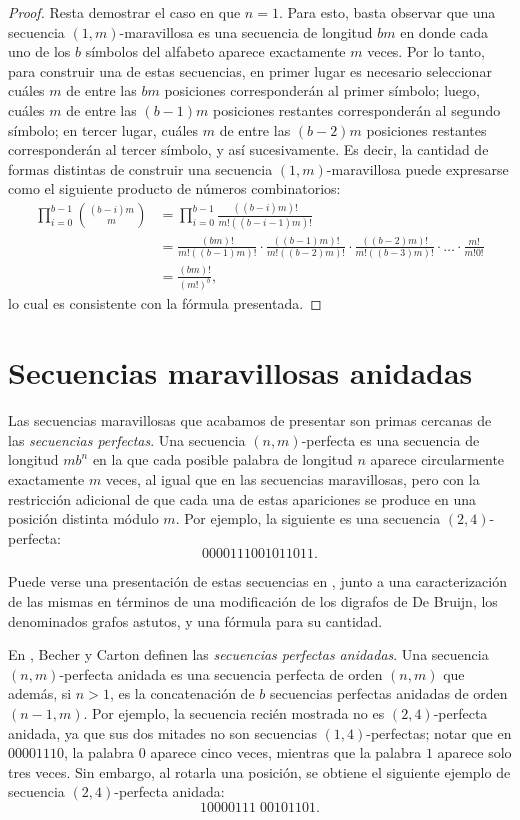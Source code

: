 \begin{proof}
	Resta demostrar el caso en que $n = 1$. Para esto, basta observar que una
	secuencia $(1,m)$-maravillosa es una secuencia de longitud $bm$ en donde
	cada uno de los $b$ símbolos del alfabeto aparece exactamente $m$ veces.
	Por lo tanto, para construir una de estas secuencias, en primer lugar es
	necesario seleccionar cuáles $m$ de entre las $bm$ posiciones corresponderán
	al primer símbolo; luego, cuáles $m$ de entre las $(b - 1)m$ posiciones
	restantes corresponderán al segundo símbolo; en tercer lugar, cuáles $m$ de
	entre las $(b - 2)m$ posiciones restantes corresponderán al tercer símbolo,
	y así sucesivamente. Es decir, la cantidad de formas distintas de construir
	una secuencia $(1,m)$-maravillosa puede expresarse como el siguiente producto
	de números combinatorios:
	\begin{align*}
		\prod_{i = 0}^{b - 1} \binom{(b - i)m}{m}
			&= \prod_{i = 0}^{b - 1} \frac{((b-i)m)!}{m!((b-i-1)m)!} \\
			&= \frac{(bm)!}{m!((b-1)m)!} \cdot
				\frac{((b-1)m)!}{m!((b-2)m)!} \cdot
				\frac{((b-2)m)!}{m!((b-3)m)!} \cdot \dots \cdot
				\frac{m!}{m!0!} \\
			&= \frac{(bm)!}{(m!)^b},
		\end{align*}
	lo cual es consistente con la fórmula presentada.
\end{proof}

\section{Secuencias maravillosas anidadas}

Las secuencias maravillosas que acabamos de presentar son primas cercanas de
las \emph{secuencias perfectas}.
Una secuencia $(n,m)$-perfecta es una secuencia de longitud $m b^n$ en la
que cada posible palabra de longitud $n$ aparece circularmente exactamente
$m$ veces, al igual que en las secuencias maravillosas, pero con la restricción
adicional de que cada una de estas apariciones se produce en una posición
distinta módulo $m$. Por ejemplo, la siguiente es una secuencia $(2,4)$-perfecta:
\[ 0000111001011011. \]

Puede verse una presentación de estas secuencias en \cite{alvarez-perfect-necklaces},
junto a una caracterización de las mismas en términos de una modificación
de los digrafos de De Bruijn, los denominados grafos astutos, y una fórmula
para su cantidad.

En \cite{becher-nested-perfect}, Becher y Carton definen las \emph{secuencias
perfectas anidadas}. Una secuencia $(n,m)$-perfecta anidada es una secuencia
perfecta de orden $(n,m)$ que además, si $n > 1$, es la concatenación de $b$
secuencias perfectas anidadas de orden $(n-1,m)$. Por ejemplo, la secuencia
recién mostrada no es $(2,4)$-perfecta anidada, ya que sus dos mitades no son secuencias
$(1,4)$-perfectas; notar que en $00001110$, la palabra $0$ aparece cinco veces,
mientras que la palabra $1$ aparece solo tres veces. Sin embargo, al rotarla
una posición, se obtiene el siguiente ejemplo de secuencia $(2,4)$-perfecta
anidada:
\[ 10000111\;00101101. \]

